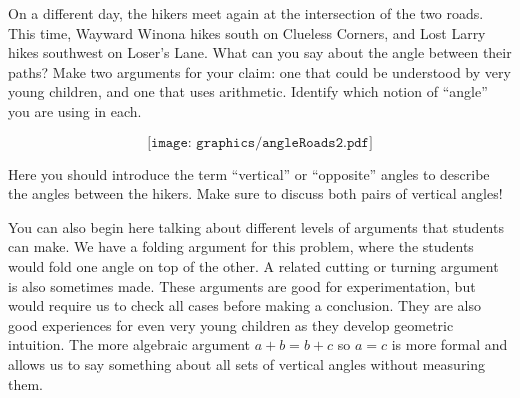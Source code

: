 \documentclass{ximera}
\begin{document}
\begin{problem}
On a different day, the hikers meet again at the intersection of the two roads.  This time, Wayward Winona hikes south on Clueless Corners, and Lost Larry hikes southwest on Loser's Lane.  What can you say about the angle between their paths?  Make two arguments for your claim: one that could be understood by very young children, and one that uses arithmetic.  Identify which notion of ``angle'' you are using in each.

\[
\texttt{[image: graphics/angleRoads2.pdf]}
\]

\begin{instructorNotes}
Here you should introduce the term ``vertical'' or ``opposite'' angles to describe the angles between the hikers.  Make sure to discuss both pairs of vertical angles!

You can also begin here talking about different levels of arguments that students can make.  We have a folding argument for this problem, where the students would fold one angle on top of the other.  A related cutting or turning argument is also sometimes made.  These arguments are good for experimentation, but would require us to check all cases before making a conclusion.  They are also good experiences for even very young children as they develop geometric intuition.  The more algebraic argument $a+b = b+c$ so $a = c$ is more formal and allows us to say something about all sets of vertical angles without measuring them.
\end{instructorNotes}
\end{problem}
\end{document}
